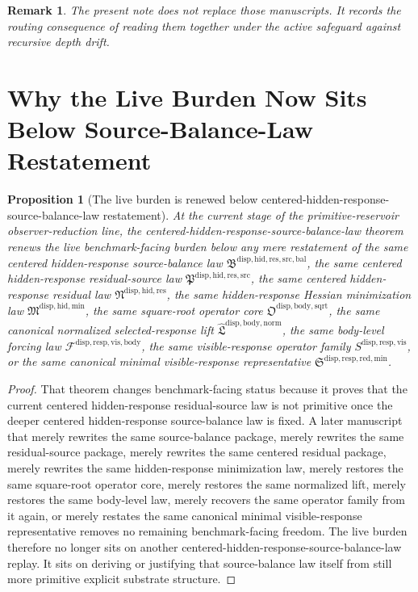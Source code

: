 \documentclass[11pt]{article}
\newcommand{\SourceBalanceLawPackage}{\mathfrak B^{\mathrm{disp,hid,res,src,bal}}}
\newcommand{\ResidualSourceLawPackage}{\mathfrak P^{\mathrm{disp,hid,res,src}}}
\newcommand{\ResidualLawPackage}{\mathfrak N^{\mathrm{disp,hid,res}}}
\newcommand{\HiddenMinimizationPackage}{\mathfrak M^{\mathrm{disp,hid,min}}}
\newcommand{\SquareRootOperatorCore}{\mathfrak O^{\mathrm{disp,body,sqrt}}}
\newcommand{\NormalizedLiftPackage}{\widehat{\mathfrak L}^{\mathrm{disp,body,norm}}}
\newcommand{\VisibleBodyForcingLaw}{\mathscr F^{\mathrm{disp,resp,vis,body}}}
\newcommand{\VisibleResponseOperator}{S^{\mathrm{disp,resp,vis}}}
\newcommand{\MinimalReducedStructure}{\mathfrak S^{\mathrm{disp,resp,red,min}}}
\newtheorem{proposition}{Proposition}
\newtheorem{remark}{Remark}
\begin{document}
\begin{remark}
The present note does not replace those manuscripts. It records the routing consequence of reading them together under the active safeguard against recursive depth drift.
\end{remark}

\section{Why the Live Burden Now Sits Below Source-Balance-Law Restatement}

\begin{proposition}[The live burden is renewed below centered-hidden-response-source-balance-law restatement]
At the current stage of the primitive-reservoir observer-reduction line, the centered-hidden-response-source-balance-law theorem renews the live benchmark-facing burden below any mere restatement of the same centered hidden-response source-balance law \(\SourceBalanceLawPackage\), the same centered hidden-response residual-source law \(\ResidualSourceLawPackage\), the same centered hidden-response residual law \(\ResidualLawPackage\), the same hidden-response Hessian minimization law \(\HiddenMinimizationPackage\), the same square-root operator core \(\SquareRootOperatorCore\), the same canonical normalized selected-response lift \(\NormalizedLiftPackage\), the same body-level forcing law \(\VisibleBodyForcingLaw\), the same visible-response operator family \(\VisibleResponseOperator\), or the same canonical minimal visible-response representative \(\MinimalReducedStructure\).
\end{proposition}

\begin{proof}
That theorem changes benchmark-facing status because it proves that the current centered hidden-response residual-source law is not primitive once the deeper centered hidden-response source-balance law is fixed. A later manuscript that merely rewrites the same source-balance package, merely rewrites the same residual-source package, merely rewrites the same centered residual package, merely rewrites the same hidden-response minimization law, merely restores the same square-root operator core, merely restores the same normalized lift, merely restores the same body-level law, merely recovers the same operator family from it again, or merely restates the same canonical minimal visible-response representative removes no remaining benchmark-facing freedom. The live burden therefore no longer sits on another centered-hidden-response-source-balance-law replay. It sits on deriving or justifying that source-balance law itself from still more primitive explicit substrate structure.
\end{proof}
\end{document}
